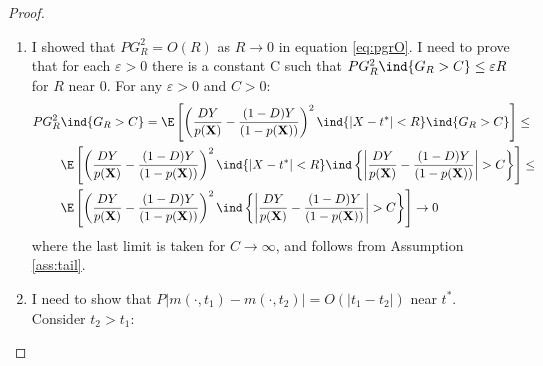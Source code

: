 {\begin{proof}
\begin{enumerate}
\begin{align}
    \end{align}
    and hence the condition is satisfied if 
    \begin{gather}
        \lim_{\alpha \rightarrow \infty} \alpha \E \left[ Y_1^2 \ind\left\{\left|Y_1 \right|> \epsilon \alpha \right\} \right] = 0 \\
        \lim_{\alpha \rightarrow \infty} \alpha \E \left[ Y_0^2 \ind\left\{\left|Y_0 \right|> \epsilon \alpha \right\} \right]= 0.
    \end{gather}
    Consider the limit for $Y_1$:
    \begin{gather}
        \lim_{\alpha \rightarrow \infty} \alpha \E \left[ Y_1^2 \ind\left\{\left|Y_1 \right|> \epsilon \alpha \right\} \right] = \lim_{\alpha \rightarrow \infty} \frac{\int_{\epsilon \alpha} Y_1^2 \varphi_1(y_1) dy_1}{\alpha^{-1}} = \lim_{\alpha \rightarrow \infty} \frac{\epsilon^3 \alpha^2 \varphi_1(\epsilon \alpha) }{\alpha^{-2}} = \\
        \lim_{\alpha \rightarrow \infty} \epsilon^3 \alpha^4 \varphi_1(\epsilon \alpha) = \lim_{\alpha \rightarrow \infty} \epsilon^3 \alpha^4 |\epsilon \alpha |^{-(4+\delta)} o(1) = 0
    \end{gather}
    where the second to last equality follows from Assumption \ref{ass:tail}.
    \item I showed that $PG_R^2 = O(R)$ as $R\rightarrow 0$ in equation \eqref{eq:pgrO}. I need to prove that for each $\varepsilon>0$ there is a constant C such that $PG_R^2 \ind\{G_R > C\} \leq \varepsilon R$ for $R$ near 0. For any $\varepsilon >0$ and $C >0$:
    \begin{align}
        PG_R^2 & \ind\{G_R > C\} = \E \left[ \left(\frac{DY}{p(\textbf{X})} - \frac{(1-D) Y}{(1-p(\textbf{X}))}\right)^2 \ind\{\left|X-t^*\right| < R\} \ind\{G_R > C\} \right] \leq \\
        &\E \left[ \left(\frac{DY}{p(\textbf{X})} - \frac{(1-D) Y}{(1-p(\textbf{X}))}\right)^2 \ind\{\left|X-t^*\right| < R\} \ind\left\{\left|\frac{DY}{p(\textbf{X})} - \frac{(1-D) Y}{(1-p(\textbf{X}))} \right|> C \right\} \right] \leq \\
        &\E \left[ \left(\frac{DY}{p(\textbf{X})} - \frac{(1-D) Y}{(1-p(\textbf{X}))}\right)^2 \ind\left\{\left|\frac{DY}{p(\textbf{X})} - \frac{(1-D) Y}{(1-p(\textbf{X}))} \right|> C \right\} \right] \rightarrow 0
    \end{align}
    where the last limit is taken for $C\rightarrow \infty$, and follows from Assumption \ref{ass:tail}.
    \item I need to show that $P\left|m\left(\cdot, t_1\right)-m\left(\cdot, t_2\right)\right|=O\left(\left|t_1-t_2\right|\right)$ near $t^*$. Consider $t_2 > t_1$:

\end{enumerate}
\end{proof}}
